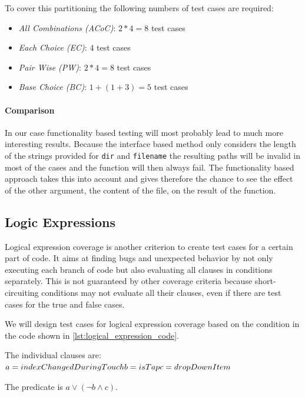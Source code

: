 \documentclass{scrreprt}
\begin{document}
To cover this partitioning the following numbers of test cases are required:
\begin{itemize}
	\item \textit{All Combinations (ACoC)}: $2*4=8$ test cases
	\item \textit{Each Choice (EC)}: $4$ test cases
	\item \textit{Pair Wise (PW)}: $2*4=8$ test cases
	\item \textit{Base Choice (BC)}: $1+(1+3)=5$ test cases
\end{itemize}

\paragraph{Comparison}

In our case functionality based testing will most probably lead to much more interesting results. Because the interface based method only considers the length of the strings provided for \texttt{dir} and \texttt{filename} the resulting paths will be invalid in most of the cases and the function will then always fail. The functionality based approach takes this into account and gives therefore the chance to see the effect of the other argument, the content of the file, on the result of the function.

\subsection{Logic Expressions}

Logical expression coverage is another criterion to create test cases for a certain part of code. It aims at finding bugs and unexpected behavior by not only executing each branch of code but also evaluating all clauses in conditions separately. This is not guaranteed by other coverage criteria because short-circuiting conditions may not evaluate all their clauses, even if there are test cases for the true and false cases.

We will design test cases for logical expression coverage based on the condition in the code shown in \vref{lst:logical_expression_code}.

The individual clauses are:\\
$
a = indexChangedDuringTouch\\
b = isTap\\
c = dropDownItem\\
$

The predicate is $a \lor (\lnot b \land c)$.
\end{document}
